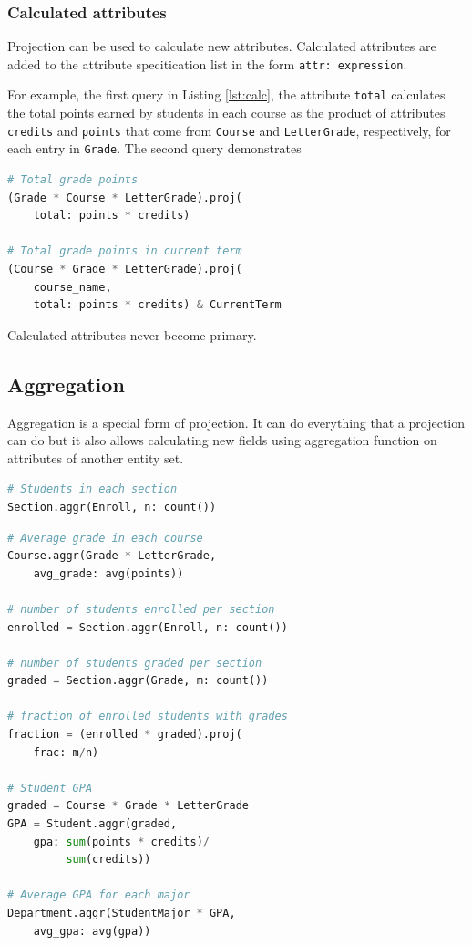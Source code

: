 \documentclass[letter,10pt]{article}
\begin{document}
\subsubsection{Calculated attributes}
Projection can be used to calculate new attributes.  
Calculated attributes are added to the attribute specitication list in the form \lstinline$attr: expression$.
 
For example, the first query in Listing \ref{lst:calc}, the attribute \lstinline$total$ calculates the total points earned by students in each course as the product of attributes \lstinline$credits$ and \lstinline$points$ that come from \lstinline$Course$ and \lstinline$LetterGrade$, respectively, for each entry in \lstinline$Grade$.
The second query demonstrates 
\begin{lstlisting}[language=Python, caption={Extension: calculated attributes.}, label={lst:calc}]
# Total grade points
(Grade * Course * LetterGrade).proj(
    total: points * credits)

# Total grade points in current term
(Course * Grade * LetterGrade).proj(
    course_name, 
    total: points * credits) & CurrentTerm
\end{lstlisting}

Calculated attributes never become primary.

\subsection{Aggregation}\label{sec:aggr}
Aggregation is a special form of projection. 
It can do everything that a projection can do but it also allows calculating new fields using aggregation function on attributes of another entity set. 
\begin{lstlisting}[language=Python, caption={Calculate summary statistics.}, label={lst:aggr1}]
# Students in each section
Section.aggr(Enroll, n: count())
\end{lstlisting}

\begin{lstlisting}[language=Python, caption={Aggregation in expressions.}, label={lst:aggr2}]
# Average grade in each course
Course.aggr(Grade * LetterGrade, 
    avg_grade: avg(points))

# number of students enrolled per section
enrolled = Section.aggr(Enroll, n: count())

# number of students graded per section
graded = Section.aggr(Grade, m: count())

# fraction of enrolled students with grades
fraction = (enrolled * graded).proj(
    frac: m/n)

# Student GPA
graded = Course * Grade * LetterGrade
GPA = Student.aggr(graded,
    gpa: sum(points * credits)/
         sum(credits))

# Average GPA for each major
Department.aggr(StudentMajor * GPA, 
    avg_gpa: avg(gpa))
\end{lstlisting}
\end{document}
